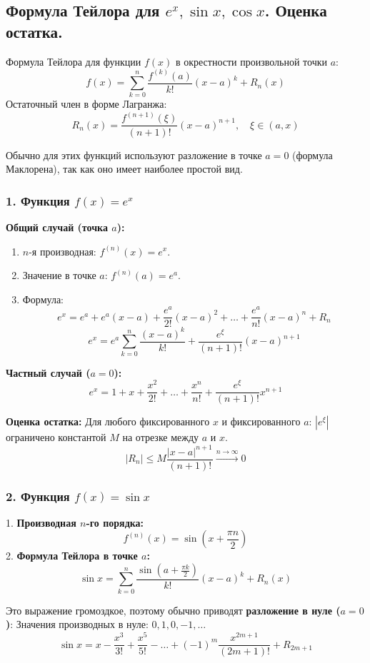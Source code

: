 \subsection{Формула Тейлора для $e^x, \sin x, \cos x$. Оценка остатка.}

Формула Тейлора для функции $f(x)$ в окрестности произвольной точки $a$:
\[ f(x) = \sum_{k=0}^n \frac{f^{(k)}(a)}{k!}(x-a)^k + R_n(x) \]
Остаточный член в форме Лагранжа:
\[ R_n(x) = \frac{f^{(n+1)}(\xi)}{(n+1)!}(x-a)^{n+1}, \quad \xi \in (a, x) \]

Обычно для этих функций используют разложение в точке $a=0$ (формула Маклорена), так как оно имеет наиболее простой вид.

\subsubsection*{1. Функция $f(x) = e^x$}

\textbf{Общий случай (точка $a$):}
\begin{enumerate}
	\item $n$-я производная: $f^{(n)}(x) = e^x$.
	\item Значение в точке $a$: $f^{(n)}(a) = e^a$.
	\item Формула:
    \[ e^x = e^a + e^a(x-a) + \frac{e^a}{2!}(x-a)^2 + \dots + \frac{e^a}{n!}(x-a)^n + R_n \]
    \[ e^x = e^a \sum_{k=0}^n \frac{(x-a)^k}{k!} + \frac{e^\xi}{(n+1)!}(x-a)^{n+1} \]
\end{enumerate}

\textbf{Частный случай ($a=0$):}
\[ e^x = 1 + x + \frac{x^2}{2!} + \dots + \frac{x^n}{n!} + \frac{e^\xi}{(n+1)!}x^{n+1} \]

\textbf{Оценка остатка:}
Для любого фиксированного $x$ и фиксированного $a$: $|e^\xi|$ ограничено константой $M$ на отрезке между $a$ и $x$.
\[ |R_n| \le M \frac{|x-a|^{n+1}}{(n+1)!} \xrightarrow{n \to \infty} 0 \]

\subsubsection*{2. Функция $f(x) = \sin x$}

1.  \textbf{Производная $n$-го порядка:}
    \[ f^{(n)}(x) = \sin\left(x + \frac{\pi n}{2}\right) \]
2.  \textbf{Формула Тейлора в точке $a$:}
    \[ \sin x = \sum_{k=0}^n \frac{\sin(a + \frac{\pi k}{2})}{k!} (x-a)^k + R_n(x) \]
    
    Это выражение громоздкое, поэтому обычно приводят \textbf{разложение в нуле ($a=0$)}:
    Значения производных в нуле: $0, 1, 0, -1, \dots$
    \[ \sin x = x - \frac{x^3}{3!} + \frac{x^5}{5!} - \dots + (-1)^m \frac{x^{2m+1}}{(2m+1)!} + R_{2m+1} \]

